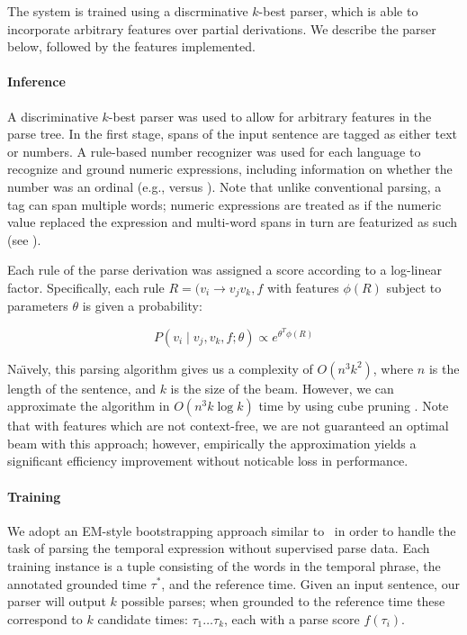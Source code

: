 The system is trained using a discrminative $k$-best parser, which is able to
  incorporate arbitrary features over partial derivations.
We describe the parser below, followed by the features implemented.

\paragraph{Inference}
A discriminative $k$-best parser was used to allow for arbitrary features
  in the parse tree.
In the first stage, spans of the input sentence are tagged as either text
  or numbers.
A rule-based number recognizer was used for each language to recognize and
  ground numeric expressions, including information on whether the number was
  an ordinal (e.g.,  versus ).
Note that unlike conventional parsing, a tag can span multiple words;
  numeric expressions are treated as if the numeric value replaced the
  expression and multi-word spans in turn are featurized as such
  (see ).

Each rule of the parse derivation was assigned a score according to a log-linear
  factor.
Specifically, each rule $R = (v_i \rightarrow v_j v_k, f$
  with features $\phi(R)$ subject to parameters
  $\theta$ is given a probability:

\begin{equation}
P(v_i \mid v_j, v_k, f; \theta) \propto e^{ \theta^T \phi(R) }
\end{equation}

Na\"{\i}vely, this parsing algorithm gives us a complexity of $O(n^3 k^2)$,
  where $n$ is the length of the sentence, and $k$ is the size of the beam.
However, we can approximate the algorithm in $O(n^3 k \log k)$ time by using
  cube pruning \cite{key:2007chiang-cubepruning}.
Note that with features which are not context-free, we are not
  guaranteed an optimal beam with this approach; however, empirically
  the approximation yields a significant efficiency improvement without
  noticable loss in performance.

\paragraph{Training}
We adopt an EM-style bootstrapping approach similar to \me\ in order to handle
  the task of parsing the temporal expression without supervised parse data.
Each training instance is a tuple consisting of the words in the temporal
	phrase, the annotated grounded time $\tau^*$, and the reference time.
Given an input sentence, our parser will output $k$ possible parses; when
  grounded to the reference time these correspond to $k$ candidate times:
  $\tau_1 \dots \tau_k$, each with a parse score $f(\tau_i)$.

